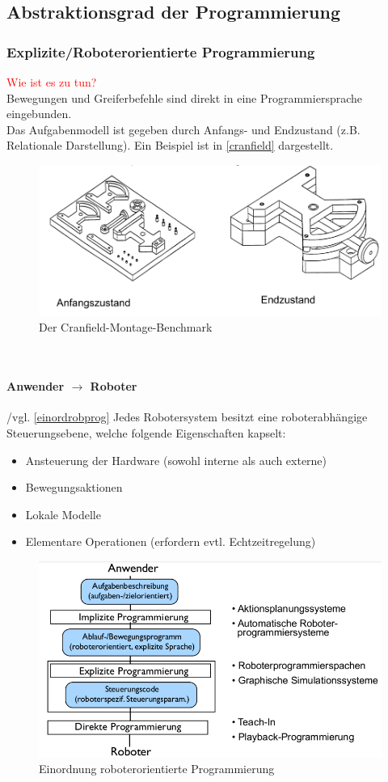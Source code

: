 \subsection{Abstraktionsgrad der Programmierung}
\subsubsection{Explizite/Roboterorientierte Programmierung}
\textcolor{red}{\glqq Wie ist es zu tun?\grqq} \\
Bewegungen und Greiferbefehle sind direkt in eine Programmiersprache eingebunden.\\
Das Aufgabenmodell ist gegeben durch Anfangs- und Endzustand (z.B. Relationale Darstellung). Ein Beispiel ist in \autoref{cranfield} dargestellt.\\
\begin{figure}[h!]\centering 
\includegraphics[width=0.7\linewidth]{figures/ch01_cranfield.png}
\caption{Der Cranfield-Montage-Benchmark}
\label{cranfield}
\end{figure}\\
\paragraph{Anwender $\rightarrow$ Roboter} /vgl. \autoref{einordrobprog}
Jedes Robotersystem besitzt eine roboterabhängige Steuerungsebene, welche folgende Eigenschaften kapselt:
\begin{itemize}
\item Ansteuerung der Hardware (sowohl interne als auch externe)
\item Bewegungsaktionen
\item Lokale Modelle
\item Elementare Operationen (erfordern evtl. Echtzeitregelung)
\end{itemize}
\begin{figure}[h!]\centering 
\includegraphics[width=0.7\linewidth]{figures/ch01_einordnung.png}
\caption{Einordnung roboterorientierte Programmierung}
\label{einordrobprog}
\end{figure}
